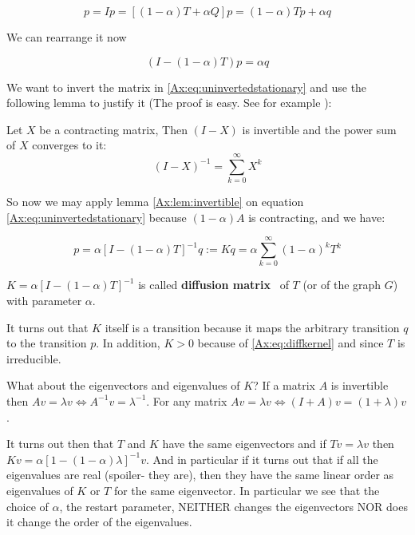 \[
p = Ip
= [(1 - \alpha)T + \alpha Q]p =  (1 - \alpha)Tp + \alpha q 
\]

We can rearrange it now

\begin{equation}
\label{Ax:eq:uninvertedstationary}
(I - (1 - \alpha)T)p = \alpha q
\end{equation}

We want to invert the matrix in \ref{Ax:eq:uninvertedstationary} and use the
following lemma to justify it (The proof is easy. See for example
\textcite{serre2010matrices}):

\begin{lemma}
\label{Ax:lem:invertible}
Let $X$ be a contracting matrix, Then $(I-X)$ is invertible and the power sum of
$X$ converges to it:
\[
(I - X)^{-1} = \sum_{k=0}^{\infty} X^k
\]
\end{lemma}

So now we may apply lemma \ref{Ax:lem:invertible} on equation
\ref{Ax:eq:uninvertedstationary} because $(1-\alpha)A$ is contracting, and we have:

\begin{equation}
\label{Ax:eq:diffkernel}
p = \alpha [I - (1 - \alpha)T]^{-1} q := K q = 
\alpha \sum_{k=0}^{\infty} (1 - \alpha)^k T^k
\end{equation}

\begin{mydef}
\label{Ax:def:diffusionmatrix}
$K = \alpha [I - (1 - \alpha)T]^{-1}$ is called \textbf{diffusion
matrix}~\cite{leiserson2015pan} of $T$ (or of the graph $G$) with parameter
$\alpha$.
\end{mydef}

It turns out that $K$ itself is a transition because it maps the
arbitrary transition $q$ to the transition $p$. In addition, $K \gt 0$ because
of \ref{Ax:eq:diffkernel} and since $T$ is irreducible.

What about the eigenvectors and eigenvalues of $K$?
If a matrix $A$ is invertible then $Av = \lambda v \iff A^{-1}v = \lambda^{-1}$.
For any matrix $Av = \lambda v \iff (I + A)v = (1+\lambda)v$.

It turns out then that $T$ and $K$ have the same eigenvectors and if $Tv=\lambda
v$ then $K v = \alpha [1 - (1 - \alpha) \lambda]^{-1} v$. And in particular if it
turns out that if all the eigenvalues are real (spoiler- they are), then they have
the same linear order as eigenvalues of $K$ or $T$ for the same eigenvector.
In particular we see that the choice of $\alpha$, the restart parameter, NEITHER 
changes the eigenvectors NOR does it change the order of the eigenvalues.

